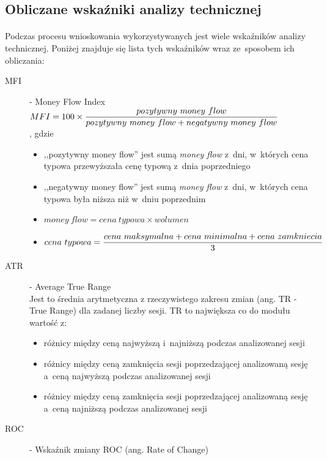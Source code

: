 \subsection{Obliczane wskaźniki analizy technicznej}

\paragraph{}
Podczas procesu wnioskowania wykorzystywanych jest wiele wskaźników analizy technicznej. Poniżej znajduje się lista tych wskaźników wraz ze~sposobem ich obliczania:
\begin{description}
	\item[MFI] - Money Flow Index \hfill \\
		$\displaystyle MFI = 100 \times { pozytywny\ money\ flow \over pozytywny \ money \ flow + negatywny\ money\ flow }$  \hfill \\
			, gdzie \hfill
				\begin{itemize}
					\item ,,pozytywny money flow'' jest sumą {\textit{money flow}} z~dni, w~których cena typowa przewyższała cenę typową z~dnia poprzedniego
					\item ,,negatywny money flow'' jest sumą {\textit{money flow}} z~dni, w~których cena typowa była niższa niż w~dniu poprzednim
					\item $\displaystyle money \ flow = cena \ typowa \times wolumen$
					\item $\displaystyle cena\ typowa = {cena \ maksymalna + cena \ minimalna + cena \ zamkniecia \over 3}$
				\end{itemize}
	\item[ATR] - Average True Range \hfill \\
		Jest to średnia arytmetyczna z rzeczywistego zakresu zmian (ang. TR - True Range) dla zadanej liczby sesji. TR to największa co do modułu wartość z:
		\begin{itemize}
			\item różnicy między ceną najwyższą i~najniższą podczas analizowanej sesji
			\item różnicy między ceną zamknięcia sesji poprzedzającej analizowaną sesję a~ceną najwyższą podczas analizowanej sesji
			\item różnicy między ceną zamknięcia sesji poprzedzającej analizowaną sesję a~ceną najniższą podczas analizowanej sesji
		\end{itemize}
	\item[ROC] - Wskaźnik zmiany ROC (ang. Rate of Change) \hfill \\

\end{description}
